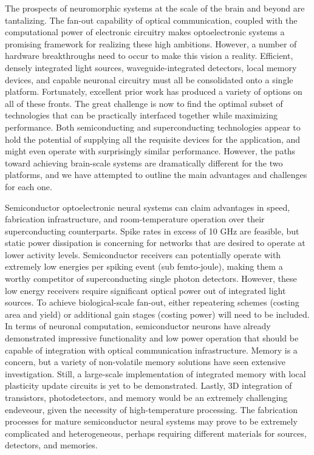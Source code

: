\documentclass[twocolumn]{article}
\begin{document}
The prospects of neuromorphic systems at the scale of the brain and beyond are tantalizing. The fan-out capability of optical communication, coupled with the computational power of electronic circuitry makes optoelectronic systems a promising framework for realizing these high ambitions. However, a number of hardware breakthroughs need to occur to make this vision a reality. Efficient, densely integrated light sources, waveguide-integrated detectors, local memory devices, and capable neuronal circuitry must all be consolidated onto a single platform. Fortunately, excellent prior work has produced a variety of options on all of these fronts. The great challenge is now to find the optimal subset of technologies that can be practically interfaced together while maximizing performance. Both semiconducting and superconducting technologies appear to hold the potential of supplying all the requisite devices for the application, and might even operate with surprisingly similar performance. However, the paths toward achieving brain-scale systems are dramatically different for the two platforms, and we have attempted to outline the main advantages and challenges for each one. 

Semiconductor optoelectronic neural systems can claim advantages in speed, fabrication infrastructure, and room-temperature operation over their superconducting counterparts. Spike rates in excess of 10 GHz are feasible, but static power dissipation is concerning for networks that are desired to operate at lower activity levels. Semiconductor receivers can potentially operate with extremely low energies per spiking event (sub femto-joule), making them a worthy competitor of superconducting single photon detectors. However, these low energy receivers require significant optical power out of integrated light sources. To achieve biological-scale fan-out, either repeatering schemes (costing area and yield) or additional gain stages (costing power) will need to be included. In terms of neuronal computation, semiconductor neurons have already demonstrated impressive functionality and low power operation that should be capable of integration with optical communication infrastructure. Memory is a concern, but a variety of non-volatile memory solutions have seen extensive investigation. Still, a large-scale implementation of integrated memory with local plasticity update circuits is yet to be demonstrated. Lastly, 3D integration of transistors, photodetectors, and memory would be an extremely challenging endeveour, given the necessity of high-temperature processing. The fabrication processes for mature semiconductor neural systems may prove to be extremely complicated and heterogeneous, perhaps requiring different materials for sources, detectors, and memories.
\end{document}
